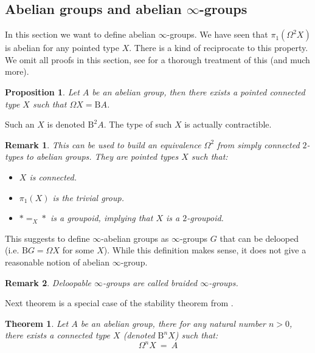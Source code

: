 \documentclass{article}
\newcommand{\sse}[1]{\medbreak \subsection{#1}}
\newcommand{\B}{\mathrm{B}}
\newtheorem{definition}{Definition}
\newtheorem{proposition}{Proposition}
\newtheorem{theorem}{Theorem}
\newtheorem{remark}{Remark}
\begin{document}
\sse{Abelian groups and abelian $\infty$-groups}

In this section we want to define abelian $\infty$-groups. We have seen that $\pi_1(\Omega^2 X)$ is abelian for any pointed type $X$. There is a kind of reciprocate to this property. We omit all proofs in this section, see \cite{buchholtz2018higher} for a thorough treatment of this (and much more).%


\begin{proposition}
Let $A$ be an abelian group, then there exists a pointed connected type $X$ such that $\Omega X = \B A$.
\end{proposition}

Such an $X$ is denoted $\B^2A$. The type of such $X$ is actually contractible.

\begin{remark}
This can be used to build an equivalence $\Omega^2$ from simply connected $2$-types to abelian groups. They are pointed types $X$ such that:
\begin{itemize}
\item $X$ is connected.
\item $\pi_1(X)$ is the trivial group.
\item $*=_X*$ is a groupoid, implying that $X$ is a $2$-groupoid.
\end{itemize}
\end{remark}

This suggests to define $\infty$-abelian groups as $\infty$-groups $G$ that can be delooped (i.e. $\B G = \Omega X$ for some $X$). While this definition makes sense, it does not give a reasonable notion of abelian $\infty$-group.

\begin{remark}
Deloopable $\infty$-groups are called \emph{braided $\infty$-groups}.
\end{remark}

 Next theorem is a special case of the stability theorem from \cite{buchholtz2018higher}.

\begin{theorem}
Let $A$ be an abelian group, there for any natural number $n>0$, there exists a connected type $X$ (denoted $\B^nX$) such that:
\[\Omega^n X \ = \ A\]
\end{theorem}
\end{document}
